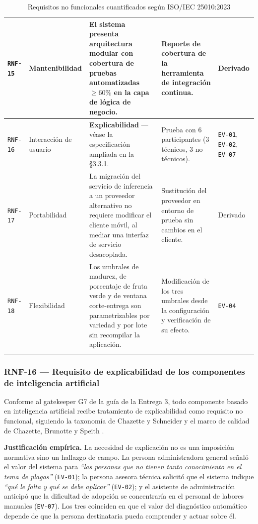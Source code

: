 \documentclass[11pt,a4paper]{article}
\newcommand{\id}[1]{\texttt{\begingroup\hyphenpenalty=10000\relax#1\endgroup}}
\renewcommand{\id}[1]{\texttt{#1}}
\begin{document}
{\begin{longtable}{|C{1.2cm}|L{2.4cm}|L{5.8cm}|L{3.1cm}|L{2.2cm}|}
\id{RNF-15} & Mantenibilidad & El sistema presenta arquitectura modular con cobertura de pruebas automatizadas $\geq 60\%$ en la capa de lógica de negocio. & Reporte de cobertura de la herramienta de integración continua. & \footnotesize Derivado \\ \hline
{}\id{RNF-16} & Interacción de usuario & \textbf{Explicabilidad} --- véase la especificación ampliada en la §3.3.1. & Prueba con 6 participantes (3 técnicos, 3 no técnicos). & \footnotesize \id{EV-01}, \id{EV-02}, \id{EV-07} \\ \hline
\id{RNF-17} & Portabilidad & La migración del servicio de inferencia a un proveedor alternativo no requiere modificar el cliente móvil, al mediar una interfaz de servicio desacoplada. & Sustitución del proveedor en entorno de prueba sin cambios en el cliente. & \footnotesize Derivado \\ \hline
\id{RNF-18} & Flexibilidad & Los umbrales de madurez, de porcentaje de fruta verde y de ventana corte-entrega son parametrizables por variedad y por lote sin recompilar la aplicación. & Modificación de los tres umbrales desde la configuración y verificación de su efecto. & \footnotesize \id{EV-04} \\ \hline
\caption{Requisitos no funcionales cuantificados según ISO/IEC 25010:2023}
\end{longtable}}

\subsubsection{RNF-16 --- Requisito de explicabilidad de los componentes de inteligencia artificial}

Conforme al gatekeeper G7 de la guía de la Entrega 3, todo componente basado en inteligencia
artificial recibe tratamiento de explicabilidad como requisito no funcional, siguiendo la taxonomía
de Chazette y Schneider \cite{chazette2020} y el marco de calidad de Chazette, Brunotte y Speith
\cite{chazette2021,chazette2022}.

\textbf{Justificación empírica.} La necesidad de explicación no es una imposición normativa sino un
hallazgo de campo. La persona administradora general señaló el valor del sistema para
\emph{``las personas que no tienen tanto conocimiento en el tema de plagas''} (\id{EV-01}); la
persona asesora técnica solicitó que el sistema indique \emph{``qué le falta y qué se debe
aplicar''} (\id{EV-02}); y el asistente de administración anticipó que la dificultad de adopción se
concentraría en el personal de labores manuales (\id{EV-07}). Los tres coinciden en que el valor del
diagnóstico automático depende de que la persona destinataria pueda comprender y actuar sobre él.
\end{document}
